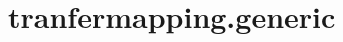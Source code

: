 \section{tranfermapping.generic}
\label{configuration:TranfermappingGeneric}
\AvailableInCsharpOnly{\TODO}